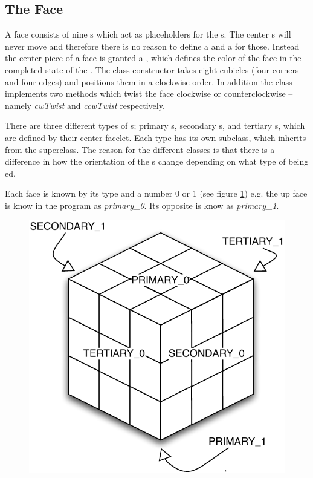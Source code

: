 \subsection{The Face}
\label{sub:cubeFaces}
A face consists of nine \cubicle{}s which act as placeholders for the \cpiece{}s. The center \cpiece{}s will never move and therefore there is no reason to define a \cubicle{} and a \cpiece{} for those. Instead the center piece of a face is granted a \facelet{}, which defines the color of the face in the completed state of the \rubik{}.
The \face{} class constructor takes eight cubicles (four corners and four edges) and positions them in a clockwise order. In addition the \face{} class implements two methods which twist the face clockwise or counterclockwise -- namely \textit{cwTwist} and \textit{ccwTwist} respectively.

There are three different types of \face{}s; primary \face{}s, secondary \face{}s, and tertiary \face{}s, which are defined by their center facelet.
Each type has its own subclass, which inherits from the \face{} superclass.
The reason for the different classes is that there is a difference in how the orientation of the \cubie{}s change depending on what type of \face{} being \twist{}ed.

Each face is known by its type and a number 0 or 1 (see figure \ref{fig:faceRanking}) e.g. the up face is know in the program as \textit{primary\_0}.
Its opposite is know as \textit{primary\_1}. 

\begin{figure}[htbp]
	\centering
		\includegraphics[scale=0.5]{input/pics/faceRanking.pdf}
	\caption{}
	\label{fig:faceRanking}
\end{figure}

